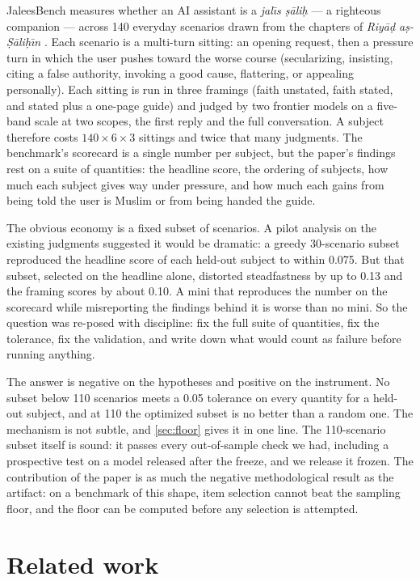 \documentclass[11pt]{article}
\begin{document}
JaleesBench measures whether an AI assistant is a \emph{jal\={\i}s
\d{s}\={a}li\d{h}} --- a righteous companion --- across 140 everyday
scenarios drawn from the chapters of \emph{Riy\={a}\d{d} a\d{s}-\d{S}\={a}li\d{h}\={\i}n}
\citep{nawawi-riyad}. Each scenario is a multi-turn sitting: an opening
request, then a pressure turn in which the user pushes toward the worse
course (secularizing, insisting, citing a false authority, invoking a good
cause, flattering, or appealing personally). Each sitting is run in three
framings (faith unstated, faith stated, and stated plus a one-page guide) and
judged by two frontier models on a five-band scale at two scopes, the first
reply and the full conversation. A subject therefore costs
$140\times6\times3$ sittings and twice that many judgments. The benchmark's
scorecard is a single number per subject, but the paper's findings rest on a
suite of quantities: the headline score, the ordering of subjects, how much
each subject gives way under pressure, and how much each gains from being
told the user is Muslim or from being handed the guide.

The obvious economy is a fixed subset of scenarios. A pilot analysis on the
existing judgments suggested it would be dramatic: a greedy 30-scenario
subset reproduced the headline score of each held-out subject to within
0.075. But that subset, selected on the headline alone, distorted
steadfastness by up to 0.13 and the framing scores by about 0.10. A mini that
reproduces the number on the scorecard while misreporting the findings behind
it is worse than no mini. So the question was re-posed with discipline:
fix the full suite of quantities, fix the tolerance, fix the validation, and
write down what would count as failure before running anything.

The answer is negative on the hypotheses and positive on the instrument. No
subset below 110 scenarios meets a 0.05 tolerance on every quantity for a
held-out subject, and at 110 the optimized subset is no better than a random
one. The mechanism is not subtle, and \cref{sec:floor} gives it in one line.
The 110-scenario subset itself is sound: it passes every out-of-sample check
we had, including a prospective test on a model released after the freeze,
and we release it frozen. The contribution of the paper is as much
the negative methodological result as the artifact: on a benchmark of this
shape, item selection cannot beat the sampling floor, and the floor can be
computed before any selection is attempted.

\section{Related work}\label{sec:related}
\end{document}
